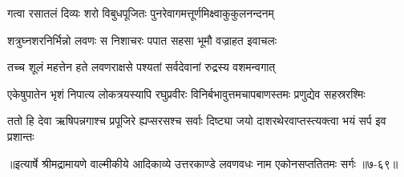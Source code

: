 \twolineshloka
{गत्वा रसातलं दिव्यः शरो विबुधपूजितः}
{पुनरेवागमत्तूर्णमिक्ष्वाकुकुलनन्दनम्} %

\twolineshloka
{शत्रुघ्नशरनिर्भिन्नो लवणः स निशाचरः}
{पपात सहसा भूमौ वज्राहत इवाचलः} %

\twolineshloka
{तच्च शूलं महत्तेन हते लवणराक्षसे}
{पश्यतां सर्वदेवानां रुद्रस्य वशमन्वगात्} %

\twolineshloka
{एकेषुपातेन भृशं निपात्य लोकत्रयस्यापि रघुप्रवीरः}
{विनिर्बभावुत्तमचापबाणस्तमः प्रणुद्येव सहस्ररश्मिः} %

\twolineshloka
{ततो हि देवा ऋषिपन्नगाश्च प्रपूजिरे ह्यप्सरसश्च सर्वाः}
{दिष्ट्या जयो दाशरथेरवाप्तस्त्यक्त्वा भयं सर्प इव प्रशान्तः} %


॥इत्यार्षे श्रीमद्रामायणे वाल्मीकीये आदिकाव्ये उत्तरकाण्डे लवणवधः नाम एकोनसप्ततितमः सर्गः ॥७-६९॥
